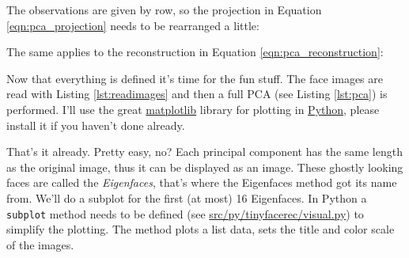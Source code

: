 \ifx\python\undefined
	
\else
	
\fi

The observations are given by row, so the projection in Equation \ref{eqn:pca_projection} needs to be rearranged a little:

\ifx\python\undefined
	
\else
	
\fi

The same applies to the reconstruction in Equation \ref{eqn:pca_reconstruction}: 

\ifx\python\undefined
	
\else
	
\fi

Now that everything is defined it's time for the fun stuff. The face images are read with Listing \ref{lst:readimages} and then a full PCA (see Listing \ref{lst:pca}) is performed. \ifx\python\ifx\python\undefined \else I'll use the great \href{http://matplotlib.sourceforge.net/}{matplotlib} library for plotting in \href{http://www.python.org}{Python}, please install it if you haven't done already.\fi

\ifx\python\undefined
	
\else
	
\fi

That's it already. Pretty easy, no? Each principal component has the same length as the original image, thus it can be displayed as an image. These ghostly looking faces are called the \textit{Eigenfaces}, that's where the Eigenfaces method got its name from. We'll do a subplot for the first (at most) 16 Eigenfaces. \ifx\python\undefined \else In Python a \lstinline|subplot| method needs to be defined (see \url{src/py/tinyfacerec/visual.py}) to simplify the plotting. The method plots a list data, sets the title and color scale of the images.\fi

